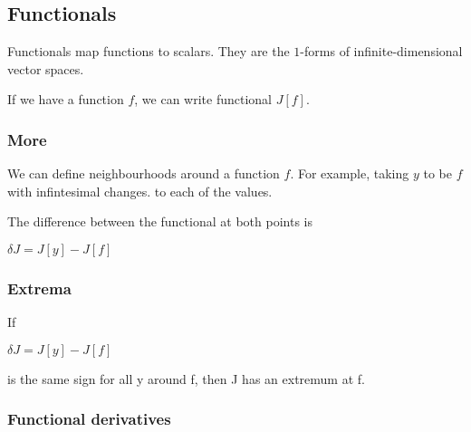 
\subsection{Functionals}

Functionals map functions to scalars. They are the \(1\)-forms of infinite-dimensional vector spaces.

If we have a function \(f\), we can write functional \(J[f]\).

\subsubsection{More}

We can define neighbourhoods around a function \(f\). For example, taking \(y\) to be \(f\) with infintesimal changes. to each of the values.

The difference between the functional at both points is

\(\delta J=J[y]-J[f]\)

\subsubsection{Extrema}

If

\(\delta J=J[y]-J[f]\)

is the same sign for all y around f, then J has an extremum at f.

\subsubsection{Functional derivatives}

